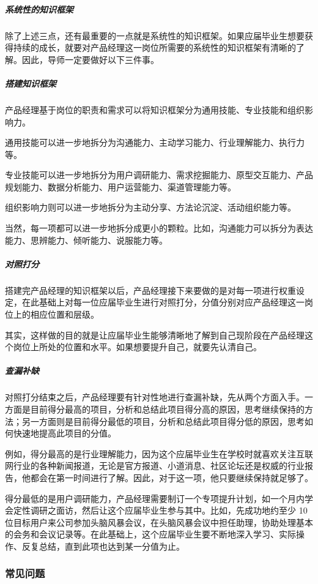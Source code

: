 \documentclass[letterpaper,11pt,english]{sphinxmanual}
\begin{document}
\subparagraph{系统性的知识框架}
\label{\detokenize{chapter_interview/new_like:id18}}
除了上述三点，还有最重要的一点就是系统性的知识框架。如果应届毕业生想要获得持续的成长，就要对产品经理这一岗位所需要的系统性的知识框架有清晰的了解。因此，导师一定要做好以下三件事。


\subparagraph{搭建知识框架}
\label{\detokenize{chapter_interview/new_like:id19}}
产品经理基于岗位的职责和需求可以将知识框架分为通用技能、专业技能和组织影响力。

通用技能可以进一步地拆分为沟通能力、主动学习能力、行业理解能力、执行力等。

专业技能可以进一步地拆分为用户调研能力、需求挖掘能力、原型交互能力、产品规划能力、数据分析能力、用户运营能力、渠道管理能力等。

组织影响力则可以进一步地拆分为主动分享、方法论沉淀、活动组织能力等。

当然，每一项都可以进一步地拆分成更小的颗粒。比如，沟通能力可以拆分为表达能力、思辨能力、倾听能力、说服能力等。


\subparagraph{对照打分}
\label{\detokenize{chapter_interview/new_like:id20}}
搭建完产品经理的知识框架以后，产品经理接下来要做的是对每一项进行权重设定，在此基础上对每一位应届毕业生进行对照打分，分值分别对应产品经理这一岗位上的相应位置和层级。

其实，这样做的目的就是让应届毕业生能够清晰地了解到自己现阶段在产品经理这个岗位上所处的位置和水平。如果想要提升自己，就要先认清自己。


\subparagraph{查漏补缺}
\label{\detokenize{chapter_interview/new_like:id21}}
对照打分结束之后，产品经理要有针对性地进行查漏补缺，先从两个方面入手。一方面是目前得分最高的项目，分析和总结此项目得分高的原因，思考继续保持的方法；另一方面则是目前得分最低的项目，分析和总结此项目得分低的原因，思考如何快速地提高此项目的分值。

例如，得分最高的是行业理解能力，因为这个应届毕业生在学校时就喜欢关注互联网行业的各种新闻报道，无论是官方报道、小道消息、社区论坛还是权威的行业报告，他都会在第一时间进行了解。因此，对于这一项，他只要继续保持就足够了。

得分最低的是用户调研能力，产品经理需要制订一个专项提升计划，如一个月内学会定性调研之面访，然后让这个应届毕业生参与其中。比如，先成功地约至少
10
位目标用户来公司参加头脑风暴会议，在头脑风暴会议中担任助理，协助处理基本的会务和会议记录等。在此基础上，这个应届毕业生要不断地深入学习、实际操作、反复总结，直到此项也达到某一分值为止。


\subsubsection{常见问题}
\label{\detokenize{chapter_interview/question:id1}}\label{\detokenize{chapter_interview/question::doc}}
\end{document}
